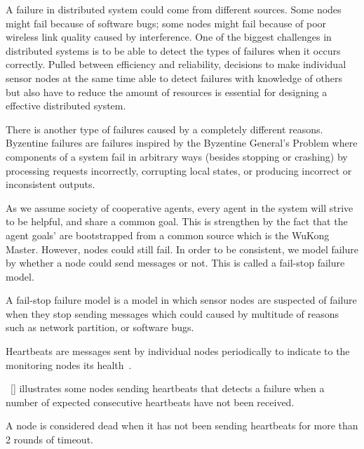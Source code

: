 
A failure in distributed system could come from different sources. Some nodes
might fail because of software bugs; some nodes might fail because of poor
wireless link quality caused by interference. One of the biggest challenges in
distributed systems is to be able to detect the types of failures when it
occurs correctly. Pulled between efficiency and reliability, decisions to make
individual sensor nodes at the same time able to detect failures with knowledge
of others but also have to reduce the amount of resources is essential for
designing a effective distributed system.


There is another type of failures caused by a completely different reasons.
Byzentine failures are failures inspired by the Byzentine General's Problem
where components of a system fail in arbitrary ways (besides stopping or
crashing) by processing requests incorrectly, corrupting local states, or
producing incorrect or inconsistent outputs.


As we assume society of cooperative agents, every agent in the system will
strive to be helpful, and share a common goal. This is strengthen by the fact
that the agent goals' are bootstrapped from a common source which is the WuKong
Master. However, nodes could still fail. In order to be consistent, we model
failure by whether a node could send messages or not. This is called
a fail-stop failure model.


A fail-stop failure model is a model in which sensor nodes are suspected of
failure when they stop sending messages which could caused by multitude of
reasons such as network partition, or software bugs.


Heartbeats are messages sent by individual nodes periodically to indicate to
the monitoring nodes its health~\cite{}.

~\ref{} illustrates some nodes sending heartbeats that detects
a failure when a number of expected consecutive heartbeats have not been
received.


A node is considered dead when it has not been sending heartbeats for more 
than 2 rounds of timeout.

